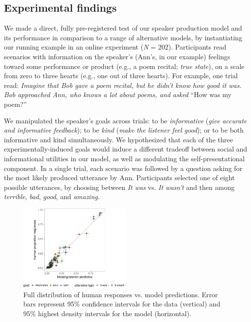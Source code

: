 \documentclass[9pt,twocolumn,twoside,lineno]{main_class_file}
\begin{document}
\subsection*{Experimental findings}
We made a direct, fully pre-registered test of our speaker production model and its performance in comparison to a range of alternative models, by instantiating our running example in an online experiment (\emph{N} = 202).
Participants read scenarios with information on the speaker's (Ann's,
in our example) feelings toward some performance or product (e.g., a poem
recital; \emph{true state}), on a scale from zero to three hearts (e.g.,
one out of three hearts). For example, one trial read: \emph{Imagine
that Bob gave a poem recital, but he didn't know how good it was. Bob
approached Ann, who knows a lot about poems, and asked} ``How was my poem?''


We manipulated the speaker's goals across trials: to be
\emph{informative} (\emph{give accurate and informative feedback});
to be \emph{kind} (\emph{make the listener feel good}); or to be
both informative and kind simultaneously. We hypothesized that
each of the three experimentally-induced goals would induce a different tradeoff between social and informational
utilities in our model, as well as modulating the self-presentational component. In a single
trial, each scenario was followed by a question asking for the most
likely produced utterance by Ann. Participants selected one of eight possible
utterances, by choosing between \emph{It was} vs. \emph{It wasn't} and
then among \emph{terrible}, \emph{bad}, \emph{good}, and \emph{amazing.}

\begin{figure}[!h]
\includegraphics[width=0.5\textwidth]{fig/variance-1} \caption{Full distribution of human responses vs. model predictions. Error bars represent 95\% confidence intervals for the data (vertical) and 95\% highest density intervals for the model (horizontal).}\label{fig:variance}
\end{figure}
\end{document}
